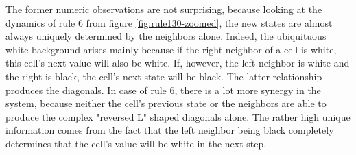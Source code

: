 \documentclass[12pt]{article}
\begin{document}
The former numeric observations are not surprising, because looking at the dynamics of rule 6 from figure \ref{fig:rule130-zoomed}, the new states are almost always uniquely determined by the neighbors alone. Indeed, the ubiquituous white background arises mainly because if the right neighbor of a cell is white, this cell's next value will also be white. If, however, the left neighbor is white and the right is black, the cell's next state will be black. The latter relationship produces the diagonals. In case of rule 6, there is a lot more synergy in the system, because neither the cell's previous state or the neighbors are able to produce the complex "reversed L" shaped diagonals alone. The rather high unique information comes from the fact that the left neighbor being black completely determines that the cell's value will be white in the next step. 
\end{document}
